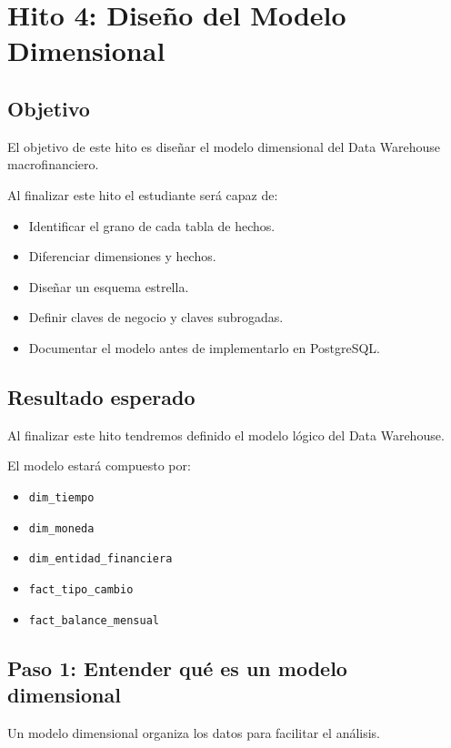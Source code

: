 \chapter{Hito 4: Diseño del Modelo Dimensional}

\section{Objetivo}

El objetivo de este hito es diseñar el modelo dimensional del Data Warehouse macrofinanciero.

Al finalizar este hito el estudiante será capaz de:

\begin{itemize}
\item Identificar el grano de cada tabla de hechos.
\item Diferenciar dimensiones y hechos.
\item Diseñar un esquema estrella.
\item Definir claves de negocio y claves subrogadas.
\item Documentar el modelo antes de implementarlo en PostgreSQL.
\end{itemize}

\section{Resultado esperado}

Al finalizar este hito tendremos definido el modelo lógico del Data Warehouse.

El modelo estará compuesto por:

\begin{itemize}
\item \texttt{dim\_tiempo}
\item \texttt{dim\_moneda}
\item \texttt{dim\_entidad\_financiera}
\item \texttt{fact\_tipo\_cambio}
\item \texttt{fact\_balance\_mensual}
\end{itemize}

\section{Paso 1: Entender qué es un modelo dimensional}

Un modelo dimensional organiza los datos para facilitar el análisis.

